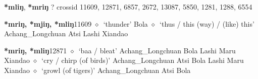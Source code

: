 \item
\textbf{*mliŋ}, \textbf{*mriŋ}
?
  {\tiny crossid 11609, 12871, 6857, 2672, 13087, 5850, 1281, 1288, 6554}
  \begin{list}{}{\leftmargin=1.5em \itemindent=-1.5em}
  \item {\footnotesize \textbf{*mriŋ, *mjiŋ, *mliŋ}}{\tiny 11609}
         $\diamond$~`thunder'
         Bola 
\hspace{1ex}
         $\diamond$~`thus / this (way) / (like) this'
         Achang\_Longchuan 
\hspace{1ex}
         Atsi 
\hspace{1ex}
         Lashi 
\hspace{1ex}
         Xiandao 
  \item {\footnotesize \textbf{*mriŋ, *mliŋ}}{\tiny 12871}
\hspace{1ex}
         $\diamond$~`baa / bleat'
         Achang\_Longchuan 
\hspace{1ex}
         Bola 
\hspace{1ex}
         Lashi 
\hspace{1ex}
         Maru 
\hspace{1ex}
         Xiandao 
\hspace{1ex}
         $\diamond$~`cry / chirp (of birds)'
         Achang\_Longchuan 
\hspace{1ex}
         Atsi 
\hspace{1ex}
         Bola 
\hspace{1ex}
         Lashi 
\hspace{1ex}
         Maru 
\hspace{1ex}
         Xiandao 
\hspace{1ex}
         $\diamond$~`growl (of tigers)'
         Achang\_Longchuan 
\hspace{1ex}
         Atsi 
\hspace{1ex}
         Bola 
\hspace{1ex}

\end{list}
